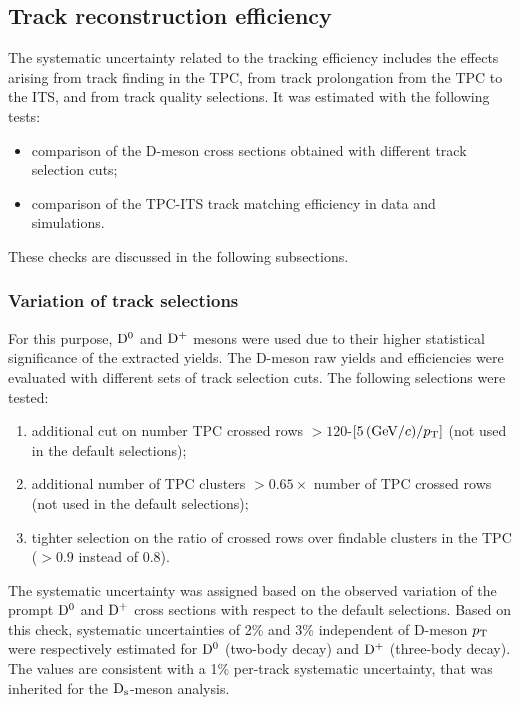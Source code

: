 \subsection{Track reconstruction efficiency}
\label{sec:TrackEffSystPP}
The systematic uncertainty related to the tracking efficiency includes the 
effects arising from track finding in the TPC, from track prolongation  
from the TPC to the ITS, and from track quality selections.
It was estimated with the following tests:
\begin{itemize}
\item comparison of the D-meson cross sections obtained with different track selection cuts;
\item comparison of the TPC-ITS track matching efficiency in data and simulations.
\end{itemize}
These checks are discussed in the following subsections.

\subsubsection{Variation of track selections}
\label{subsec:trackEffpp}
For this purpose, ${\rm D^0}$ and ${\rm D^+}$ mesons were used due to their
higher statistical significance of the extracted yields.
The D-meson raw yields and efficiencies were evaluated with 
different sets of track selection cuts.
The following selections were tested:
\begin{enumerate}
\item additional cut on number TPC crossed rows $> 120$-$[5\, ( \mathrm{GeV}/c )/p_{\rm T}]$ (not used in the default selections);
\item additional number of TPC clusters $>0.65 \times$ number of TPC crossed rows (not used in the default selections);
\item tighter selection on the ratio of crossed rows over findable clusters in the TPC ($>0.9$ instead of 0.8).
\end{enumerate}
The systematic uncertainty was assigned based on the observed variation of
the prompt ${\rm D^0}$ and ${\rm D^+}$ cross sections with respect to the default selections.
Based on this check, systematic uncertainties of 2\% and 3\% independent of D-meson $p_{\rm T}$ were 
respectively estimated for ${\rm D^0}$ (two-body decay) and ${\rm D^+}$ (three-body decay). 
The values are consistent with a 1\% per-track systematic
uncertainty, that was inherited for the ${\rm D_s}$-meson analysis.

